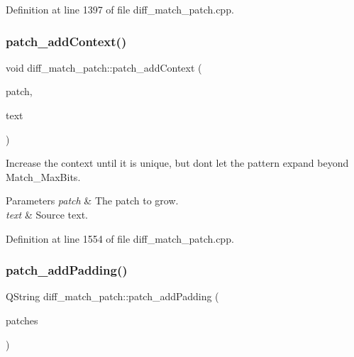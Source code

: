 Definition at line 1397 of file diff\+\_\+match\+\_\+patch.\+cpp.

\mbox{\label{classdiff__match__patch_a330cc0e446453f69d18a90ba9887c7db}} 
\subsubsection{\texorpdfstring{patch\+\_\+add\+Context()}{patch\_addContext()}}
{\footnotesize\ttfamily void diff\+\_\+match\+\_\+patch\+::patch\+\_\+add\+Context (\begin{DoxyParamCaption}\item[{\hyperlink{class_patch}{Patch} \&}]{patch,  }\item[{const Q\+String \&}]{text }\end{DoxyParamCaption})\hspace{0.3cm}{\ttfamily [protected]}}

Increase the context until it is unique, but don\textquotesingle{}t let the pattern expand beyond Match\+\_\+\+Max\+Bits. 
\begin{DoxyParams}{Parameters}
{\em patch} & The patch to grow. \\
\hline
{\em text} & Source text. \\
\hline
\end{DoxyParams}


Definition at line 1554 of file diff\+\_\+match\+\_\+patch.\+cpp.

\mbox{\label{classdiff__match__patch_a03d8b23bf20cbfc3e454aad38ff366d8}} 
\subsubsection{\texorpdfstring{patch\+\_\+add\+Padding()}{patch\_addPadding()}}
{\footnotesize\ttfamily Q\+String diff\+\_\+match\+\_\+patch\+::patch\+\_\+add\+Padding (\begin{DoxyParamCaption}\item[{Q\+List$<$ \hyperlink{class_patch}{Patch} $>$ \&}]{patches }\end{DoxyParamCaption})}

